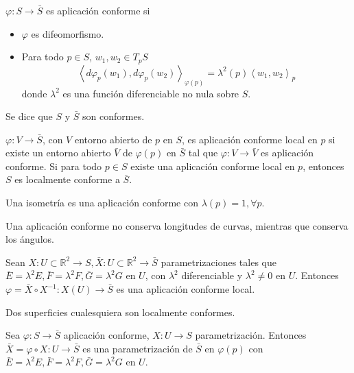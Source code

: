 \begin{definition}
    $\varphi: S \to \bar{S}$ es aplicación conforme si
    \begin{itemize}
        \item $\varphi$ es difeomorfismo.
        \item Para todo $p \in S$, $w_1, w_2 \in T_pS$
              $$\left\langle d\varphi_p(w_1), d\varphi_p(w_2) \right\rangle _{\varphi(p)} = \lambda^2(p) \left\langle w_1, w_2 \right\rangle _p$$
              donde $\lambda^2$ es una función diferenciable no nula sobre $S$.
    \end{itemize}
    Se dice que $S$ y $\bar{S}$ son conformes.
\end{definition}

\begin{definition}
    $\varphi: V \to \bar{S}$, con $V$ entorno abierto de $p$ en $S$, es aplicación conforme local en $p$ si existe un entorno abierto $\bar{V}$ de $\varphi(p)$ en $\bar{S}$ tal que $\varphi: V \to \bar{V}$ es aplicación conforme.
    Si para todo $p \in S$ existe una aplicación conforme local en $p$, entonces $S$ es localmente conforme a $\bar{S}$.
\end{definition}

\begin{remark}
    Una isometría es una aplicación conforme con $\lambda(p) = 1, \forall p$.
\end{remark}

\begin{note}
    Una aplicación conforme no conserva longitudes de curvas, mientras que conserva los ángulos.
\end{note}

\begin{proposition}
    Sean $X: U \subset \mathbb{R}^2 \to S, \bar{X}: U \subset \mathbb{R}^2 \to \bar{S}$ parametrizaciones tales que $\bar{E} = \lambda^2 E, \bar{F} = \lambda^2 F, \bar{G} = \lambda^2 G$ en $U$, con $\lambda^2$ diferenciable y $\lambda^2 \neq 0$ en $U$.
    Entonces $\varphi = \bar{X} \circ X^{-1}: X(U) \to \bar{S}$ es una aplicación conforme local.
\end{proposition}

\begin{corollary}
    Dos superficies cualesquiera son localmente conformes.
\end{corollary}

\begin{proposition}
    Sea $\varphi: S \to \bar{S}$ aplicación conforme, $X: U \to S$ parametrización.
    Entonces $\bar{X} = \varphi \circ X: U \to \bar{S}$ es una parametrización de $\bar{S}$ en $\varphi(p)$ con $\bar{E} = \lambda^2 E, \bar{F} = \lambda^2 F, \bar{G} = \lambda^2 G$ en $U$.
\end{proposition}

